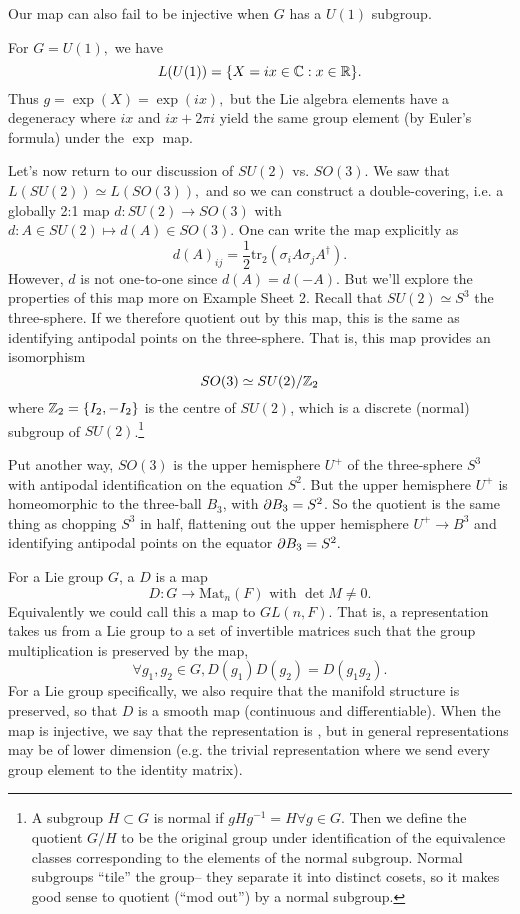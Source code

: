 Our map can also fail to be injective when $G$ has a $U(1)$ subgroup. 
\begin{exm}
For $G=U(1),$ we have 
$$L(U(1))=\{X=ix \in \mathbb{C}: x\in \mathbb{R}\}.$$
Thus $g=\exp(X)=\exp (ix),$
but the Lie algebra elements have a degeneracy where $ix$ and $ix+2\pi i$ yield the same group element (by Euler's formula) under the $\exp$ map.
\end{exm}

Let's now return to our discussion of $SU(2)$ vs. $SO(3).$ We saw that $L(SU(2))\simeq L(SO(3)),$ and so we can construct a double-covering, i.e. a globally 2:1 map
$d:SU(2)\to SO(3)$ with $d: A\in SU(2) \mapsto d(A) \in SO(3).$ One can write the map explicitly as
$$d(A)_{ij} =\frac{1}{2} \text{tr}_2 (\sigma_i A \sigma_j A^\dagger).$$
However, $d$ is not one-to-one since $d(A)=d(-A).$ But we'll explore the properties of this map more on Example Sheet 2. Recall that $SU(2)\simeq S^3$ the three-sphere. If we therefore quotient out by this map, this is the same as identifying antipodal points on the three-sphere. That is, this map provides an isomorphism
$$SO(3) \simeq SU(2)/\mathbb{Z}_2$$
where $\mathbb{Z}_2=\{I_2,-I_2\}$ is the centre of $SU(2)$, which is a discrete (normal) subgroup of $SU(2)$.\footnote{A subgroup $H\subset G$ is normal if $gHg^{-1}=H \forall g\in G$. Then we define the quotient $G/H$ to be the original group under identification of the equivalence classes corresponding to the elements of the normal subgroup. Normal subgroups ``tile'' the group-- they separate it into distinct cosets, so it makes good sense to quotient (``mod out'') by a normal subgroup.}

Put another way, $SO(3)$ is the upper hemisphere $U^+$ of the three-sphere $S^3$ with antipodal identification on the equation $S^2$. But the upper hemisphere $U^+$ is homeomorphic to the three-ball $B_3$, with $\partial B_3 = S^2$. So the quotient is the same thing as chopping $S^3$ in half, flattening out the upper hemisphere $U^+\to B^3$ and identifying antipodal points on the equator $\partial B_3 =S^2.$

\begin{defn}
For a Lie group $G$, a  $D$ is a map
$$D:G\to \text{Mat}_n(F)\text{ with }\det M \neq 0.$$
Equivalently we could call this a map to $GL(n,F).$ That is, a representation takes us from a Lie group to a set of invertible matrices such that the group multiplication is preserved by the map,
$$\forall g_1,g_2\in G, D(g_1)D(g_2)=D(g_1g_2).$$
For a Lie group specifically, we also require that the manifold structure is preserved, so that $D$ is a smooth map (continuous and differentiable). When the map is injective, we say that the representation is , but in general representations may be of lower dimension (e.g. the trivial representation where we send every group element to the identity matrix).
\end{defn}


